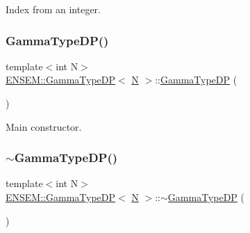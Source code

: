Index from an integer. 

\mbox{\label{classENSEM_1_1GammaTypeDP_a1833bb262c5e172a0463d853c76c1d18}} 
\subsubsection{\texorpdfstring{GammaTypeDP()}{GammaTypeDP()}\hspace{0.1cm}{\footnotesize\ttfamily [5/6]}}
{\footnotesize\ttfamily template$<$int N$>$ \\
\mbox{\hyperlink{classENSEM_1_1GammaTypeDP}{E\+N\+S\+E\+M\+::\+Gamma\+Type\+DP}}$<$ \mbox{\hyperlink{adat__devel_2lib_2hadron_2operator__name__util_8cc_a7722c8ecbb62d99aee7ce68b1752f337}{N}} $>$\+::\mbox{\hyperlink{classENSEM_1_1GammaTypeDP}{Gamma\+Type\+DP}} (\begin{DoxyParamCaption}{ }\end{DoxyParamCaption})\hspace{0.3cm}{\ttfamily [inline]}}



Main constructor. 

\mbox{\label{classENSEM_1_1GammaTypeDP_ad0e6f055b87687dac9b7b95e6ec808b0}} 
\subsubsection{\texorpdfstring{$\sim$GammaTypeDP()}{~GammaTypeDP()}\hspace{0.1cm}{\footnotesize\ttfamily [3/3]}}
{\footnotesize\ttfamily template$<$int N$>$ \\
\mbox{\hyperlink{classENSEM_1_1GammaTypeDP}{E\+N\+S\+E\+M\+::\+Gamma\+Type\+DP}}$<$ \mbox{\hyperlink{adat__devel_2lib_2hadron_2operator__name__util_8cc_a7722c8ecbb62d99aee7ce68b1752f337}{N}} $>$\+::$\sim$\mbox{\hyperlink{classENSEM_1_1GammaTypeDP}{Gamma\+Type\+DP}} (\begin{DoxyParamCaption}{ }\end{DoxyParamCaption})\hspace{0.3cm}{\ttfamily [inline]}}



